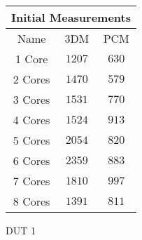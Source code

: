     \begin{tabular}{|| c | c | c ||}
    \hline
    \multicolumn{3}{||c||}{Initial Measurements} \\ [0.5ex] \hline\hline
    Name & 3DM & PCM \\\hline
    1 Core & $1207$ & $630$ \\
    2 Cores & $1470$ & $579$ \\
    3 Cores & $1531$ & $770$ \\
    4 Cores & $1524$ & $913$ \\
    5 Cores & $2054$ & $820$ \\
    6 Cores & $2359$ & $883$ \\
    7 Cores & $1810$ & $997$ \\
    8 Cores & $1391$ & $811$ \\\hline
    \end{tabular}
    \caption{DUT 1}
    \label{tab:initial-measurements-exp-3-dut-1-app}
